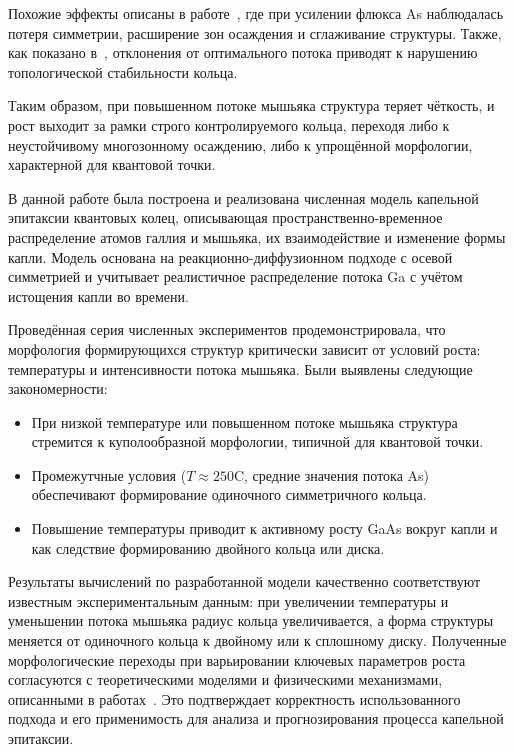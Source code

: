 \documentclass[14pt,oneside]{extarticle}
\begin{document}
Похожие эффекты описаны в работе~\cite{fan2023evaporation}, где при усилении флюкса As наблюдалась потеря симметрии, расширение зон осаждения и сглаживание структуры. Также, как показано в~\cite{mano2005nano}, отклонения от оптимального потока приводят к нарушению топологической стабильности кольца.

Таким образом, при повышенном потоке мышьяка структура теряет чёткость, и рост выходит за рамки строго контролируемого кольца, переходя либо к неустойчивому многозонному осаждению, либо к упрощённой морфологии, характерной для квантовой точки.

\pagebreak
{}

В данной работе была построена и реализована численная модель капельной эпитаксии квантовых колец, описывающая пространственно-временное распределение атомов галлия и мышьяка, их взаимодействие и изменение формы капли. Модель основана на реакционно-диффузионном подходе с осевой симметрией и учитывает реалистичное распределение потока Ga с учётом истощения капли во времени.

Проведённая серия численных экспериментов продемонстрировала, что морфология формирующихся структур критически зависит от условий роста: температуры и интенсивности потока мышьяка. Были выявлены следующие закономерности:

\begin{itemize}
    \item При низкой температуре или повышенном потоке мышьяка структура стремится к куполообразной морфологии, типичной для квантовой точки.
    \item Промежутчные условия ($T \approx 250$\textdegree C, средние значения потока As) обеспечивают формирование одиночного симметричного кольца.
    \item Повышение температуры приводит к активному росту GaAs вокруг капли и как следствие формированию двойного кольца или диска.
\end{itemize}

Результаты вычислений по разработанной модели качественно соответствуют известным экспериментальным данным: при увеличении температуры и уменьшении потока мышьяка радиус кольца увеличивается, а форма структуры меняется от одиночного кольца к двойному или к сплошному диску. Полученные морфологические переходы при варьировании ключевых параметров роста согласуются с теоретическими моделями и физическими механизмами, описанными в работах~\cite{zhou2013,mano2005nano,fan2023evaporation}. Это подтверждает корректность использованного подхода и его применимость для анализа и прогнозирования процесса капельной эпитаксии.
\end{document}

